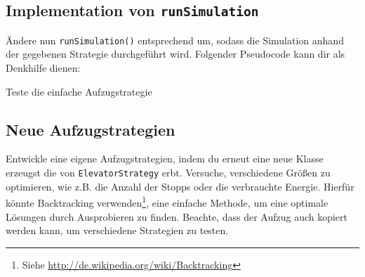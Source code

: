 \subsection{Implementation von \lstinline{runSimulation}}
Ändere nun \lstinline{runSimulation()} entsprechend um, sodass die Simulation anhand der gegebenen Strategie durchgeführt wird.
Folgender Pseudocode kann dir als Denkhilfe dienen:

\begin{algorithm}[H]
 \SetAlgoLined
\end{algorithm}

Teste die einfache Aufzugstrategie

\subsection{Neue Aufzugstrategien \optional}
\optionaltextbox
Entwickle eine eigene Aufzugstrategien, indem du erneut eine neue Klasse erzeugst die von \lstinline{ElevatorStrategy} erbt.
Versuche, verschiedene Größen zu optimieren, wie z.B. die Anzahl der Stopps oder die verbrauchte Energie.
Hierfür könnte Backtracking verwenden\footnote{Siehe \url{http://de.wikipedia.org/wiki/Backtracking}}, eine einfache Methode, um eine optimale Lösungen durch Ausprobieren zu finden.
Beachte, dass der Aufzug auch kopiert werden kann, um verschiedene Strategien zu testen.
